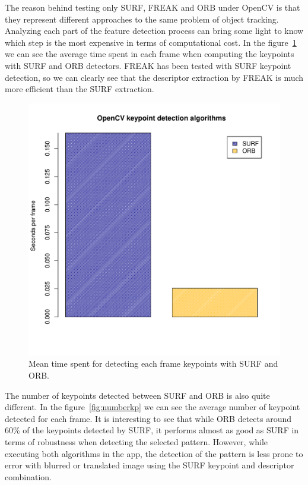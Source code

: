 The reason behind testing only SURF, FREAK and ORB under OpenCV is that they
represent different approaches to the same problem of object tracking. Analyzing
each part of the feature detection process can bring some light to know which step
is the most expensive in terms of computational cost. In the
figure~\ref{fig:kpperformance} we can see the average time spent in each frame when
computing the keypoints with SURF and ORB detectors. FREAK has been tested with SURF
keypoint detection, so we can clearly see that the descriptor extraction by FREAK is
much more efficient than the SURF extraction.

\begin{figure}
\centering
\includegraphics[scale=0.75]{performance/keypoints.pdf}
\caption{\label{fig:kpperformance} Mean time spent for detecting each frame
  keypoints with SURF and ORB.}
\end{figure} 

The number of keypoints detected between SURF and ORB is also quite different. In
the figure~\ref{fig:numberkp} we can see the average number of keypoint detected for
each frame. It is interesting to see that while ORB detects around 60\% of the
keypoints detected by SURF, it performs almost as good as SURF in terms of
robustness when detecting the selected pattern. However, while executing both
algorithms in the app, the detection of the pattern is less prone to error with
blurred or translated image using the SURF keypoint and descriptor combination. 

